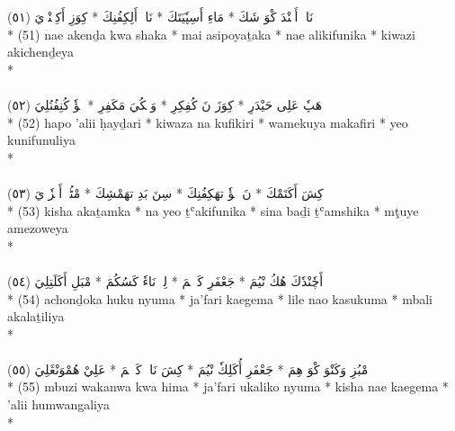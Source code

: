 \documentclass[a4paper, 12pt]{report}
\begin{document}
\begin{center}
\textarabic{(٥١) \textcolor{mygreen}{نَاءٖ أَكٖنْدَ كْوَ شَكَ  * مَاءِ أَسِپٗيَتَكَ  * نَاءٖ أَلِكِفُنِكَ  * كِوَزِ أَكِچٖنْدٖيَ }} \\* 
(51) nae akenḏa kwa shaka  * mai asipoyaṯaka  * nae alikifunika  * kiwazi akichenḏeya  \\* 
 \\ 
\\[8mm] 

\textarabic{(٥٢) \textcolor{mygreen}{هَپٗ عَلِى حَيْدَرِ  * كِوَزَ نَ كُفِكِرِ  * وَمٖكُيَ مَكَفِرِ  * يٖؤٗ كُنِفُنُلِيَ }} \\* 
(52) hapo 'alii ḥayḏari  * kiwaza na kufikiri  * wamekuya makafiri  * yeo kunifunuliya  \\* 
 \\ 
\\[8mm] 

\textarabic{(٥٣) \textcolor{mygreen}{كِشَ أَكَتَمْكَ  * نَ يٖؤٗ تهَكِفُنِكَ  * سِنَ بَدِ تهَمْشِكَ  * مْٹُيٖ أَمٖزٗوٖيَ }} \\* 
(53) kisha akaṯamka  * na yeo ṯʿakifunika  * sina baḏi ṯʿamshika  * mţuye amezoweya  \\* 
 \\ 
\\[8mm] 

\textarabic{(٥٤) \textcolor{mygreen}{أَچٗنْدٗكَ هُكُ نْيُمَ  * جَعْفَرِ كَئٖڠٖمَ  * لِلٖ نَاءٗ كَسُكُمَ  * مْبَلِ أَكَلَتِلِيَ }} \\* 
(54) achonḏoka huku nyuma  * ja'fari kaegema  * lile nao kasukuma  * mbali akalaṯiliya  \\* 
 \\ 
\\[8mm] 

\textarabic{(٥٥) \textcolor{mygreen}{مْبُزِ وَكَنْوَ كْوَ هِمَ  * جَعْفَرِ أُكَلِكٗ نْيُمَ  * كِشَ نَاءٖ كَئٖڠٖمَ  * عَلِيْ هُمْوَنْڠَلِيَ }} \\* 
(55) mbuzi wakanwa kwa hima  * ja'fari ukaliko nyuma  * kisha nae kaegema  * 'alii humwangaliya  \\* 
 \\ 
\\[8mm] 


\end{center}
\end{document}
